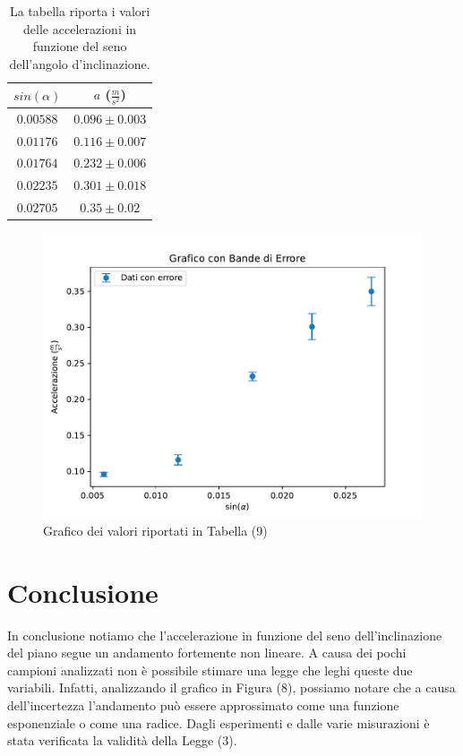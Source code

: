 \documentclass[11pt]{article}
\begin{document}
\begin{table}[H]
\centering
\begin{tabular}{|c|c|}
\hline
\textbf{$sin(\alpha)$} & \textbf{$a$ ($\frac{m}{s^2}$)} \\
\hline
$0.00588$ & $0.096\pm 0.003$ \\
$0.01176$ & $0.116\pm 0.007$ \\
$0.01764$ & $0.232\pm 0.006$ \\
$0.02235$ & $0.301\pm 0.018$ \\
$0.02705$ & $0.35\pm 0.02$ \\
\hline
\end{tabular}
\caption{La tabella riporta i valori delle accelerazioni in funzione del seno dell'angolo d'inclinazione.}
\label{tab:}
\end{table}
\begin{figure}[H]
  \centering
  \includegraphics[width=1\textwidth]{grafico1p2.pdf}
  \caption{Grafico dei valori riportati in Tabella (9)}
\end{figure}

\section{Conclusione}
In conclusione notiamo che l'accelerazione in funzione del seno dell'inclinazione del piano segue un andamento fortemente non lineare. A causa dei pochi campioni analizzati non è possibile stimare una legge che leghi queste due variabili. Infatti, analizzando il grafico in Figura (8), possiamo notare che a causa dell'incertezza l'andamento può essere approssimato come una funzione esponenziale o come una radice. Dagli esperimenti e dalle varie misurazioni è stata verificata la validità della Legge (3).
\end{document}
